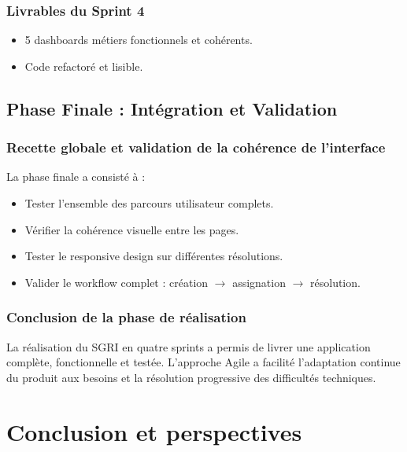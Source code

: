 \documentclass[12pt,a4paper,twoside]{report}
\begin{document}
\subsection{Livrables du Sprint 4}

\begin{itemize}
    \item 5 dashboards métiers fonctionnels et cohérents.
    \item Code refactoré et lisible.
\end{itemize}

\section{Phase Finale : Intégration et Validation}

\subsection{Recette globale et validation de la cohérence de l'interface}

La phase finale a consisté à :
\begin{itemize}
    \item Tester l'ensemble des parcours utilisateur complets.
    \item Vérifier la cohérence visuelle entre les pages.
    \item Tester le responsive design sur différentes résolutions.
    \item Valider le workflow complet : création $\rightarrow$ assignation $\rightarrow$ résolution.
\end{itemize}

\subsection{Conclusion de la phase de réalisation}

La réalisation du SGRI en quatre sprints a permis de livrer une application complète, fonctionnelle et testée. L'approche Agile a facilité l'adaptation continue du produit aux besoins et la résolution progressive des difficultés techniques.

\chapter{Conclusion et perspectives}
\end{document}
